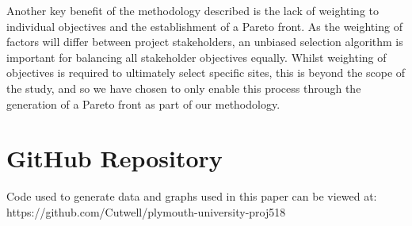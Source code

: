 \documentclass[preprint,12pt]{elsarticle}
\begin{document}
Another key benefit of the methodology described is the lack of weighting to individual objectives and the establishment of a Pareto front. As the weighting of factors will differ between project stakeholders, an unbiased selection algorithm is important for balancing all stakeholder objectives equally. Whilst weighting of objectives is required to ultimately select specific sites, this is beyond the scope of the study, and so we have chosen to only enable this process through the generation of a Pareto front as part of our methodology.

\newpage

\appendix

\section{GitHub Repository}
Code used to generate data and graphs used in this paper can be viewed at: https://github.com/Cutwell/plymouth-university-proj518

 


\end{document}
